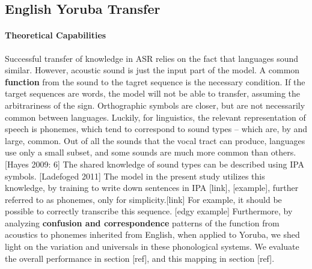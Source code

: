 \documentclass[11pt]{article}
\begin{document}
\subsection{English Yoruba Transfer}
\paragraph{Theoretical Capabilities} Successful transfer of knowledge in ASR relies on the fact that languages sound similar. However, acoustic sound is just the input part of the model. A common \textbf{function} from the sound to the tagret sequence is the necessary condition. If the target sequences are words, the model will not be able to transfer, assuming the arbitrariness of the sign. Orthographic symbols are closer, but are not necessarily common between languages. Luckily, for linguistics, the relevant representation of speech is phonemes, which tend to correspond to sound types -- which are, by and large, common. Out of all the sounds that the vocal tract can produce, languages use only a small subset, and some sounds are much more common than others. [Hayes 2009: 6] The shared knowledge of sound types can be described using IPA symbols. [Ladefoged 2011] The model in the present study utilizes this knowledge, by training to write down sentences in IPA [link], [example], further referred to as phonemes, only for simplicity.[link] For example, it should be possible to correctly transcribe this sequence. [edgy example]  Furthermore, by analyzing \textbf{confusion and correspondence} patterns of the function from acoustics to phonemes inherited from English, when applied to Yoruba, we shed light on the variation and universals in these phonological systems. We evaluate the overall performance in section [ref], and this mapping in section [ref].
\end{document}
